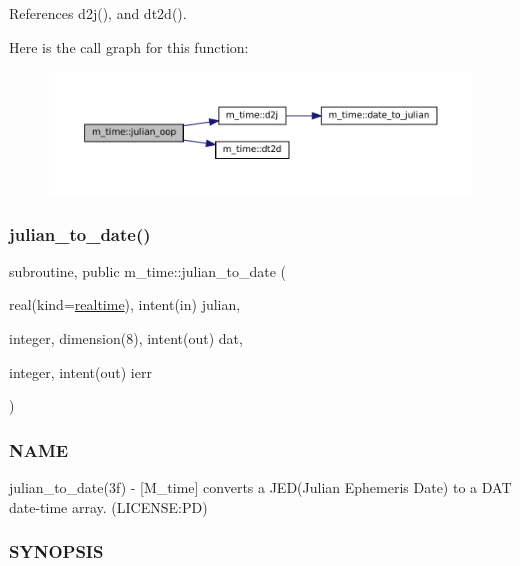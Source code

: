 References d2j(), and dt2d().

Here is the call graph for this function\+:\nopagebreak
\begin{figure}[H]
\begin{center}
\leavevmode
\includegraphics[width=350pt]{namespacem__time_aff0a1b524b578e85efe20b87fbe9db61_cgraph}
\end{center}
\end{figure}
\mbox{\label{namespacem__time_abb44cf18cd0a3e420c20469efb056203}} 
\subsubsection{\texorpdfstring{julian\+\_\+to\+\_\+date()}{julian\_to\_date()}}
{\footnotesize\ttfamily subroutine, public m\+\_\+time\+::julian\+\_\+to\+\_\+date (\begin{DoxyParamCaption}\item[{real(kind=\mbox{\hyperlink{namespacem__time_ac10ea9e8d59ec74eaa7d89f2517d7422}{realtime}}), intent(in)}]{julian,  }\item[{integer, dimension(8), intent(out)}]{dat,  }\item[{integer, intent(out)}]{ierr }\end{DoxyParamCaption})}



\subsubsection*{N\+A\+ME}

julian\+\_\+to\+\_\+date(3f) -\/ \mbox{[}M\+\_\+time\mbox{]} converts a J\+E\+D(\+Julian Ephemeris Date) to a D\+AT date-\/time array. (L\+I\+C\+E\+N\+SE\+:PD) 

\subsubsection*{S\+Y\+N\+O\+P\+S\+IS}

